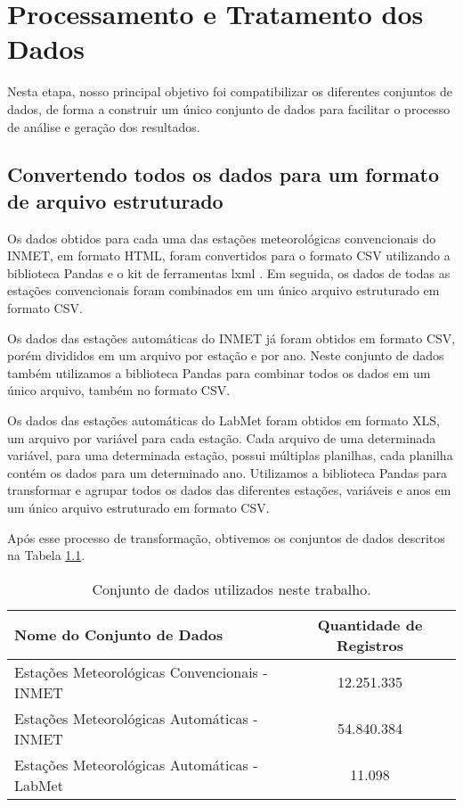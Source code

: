 \chapter{Processamento e Tratamento dos Dados}

Nesta etapa, nosso principal objetivo foi compatibilizar os diferentes conjuntos de dados, de forma a construir um único conjunto de dados para facilitar o processo de análise e geração dos resultados.

\section{Convertendo todos os dados para um formato de arquivo estruturado}

Os dados obtidos para cada uma das estações meteorológicas convencionais do INMET,  em formato HTML, foram convertidos para o formato CSV utilizando a biblioteca Pandas \cite{mckinney2011pandas} e o kit de ferramentas lxml \cite{behnel2005lxml}. Em seguida, os dados de todas as estações convencionais foram combinados em um único arquivo estruturado em formato CSV. 

Os dados das estações automáticas do INMET já foram obtidos em formato CSV, porém divididos em um arquivo por estação e por ano. Neste conjunto de dados também utilizamos a biblioteca Pandas para combinar todos os dados em um único arquivo, também no formato CSV.

Os dados das estações automáticas do LabMet foram obtidos em formato XLS, um arquivo por variável para cada estação. Cada arquivo de uma determinada variável, para uma determinada estação, possui múltiplas planilhas, cada planilha contém os dados para um determinado ano. Utilizamos a biblioteca Pandas para transformar e agrupar todos os dados das diferentes estações, variáveis e anos em um único arquivo estruturado em formato CSV.


Após esse processo de transformação, obtivemos os conjuntos de dados descritos na Tabela \ref{tab:lista_conjunto_de_dados}.

\begin{table}[H]
\caption{Conjunto de dados utilizados neste trabalho.}
\label{tab:lista_conjunto_de_dados}
\begin{tabular}{|l|c|}
\hline
\textbf{Nome do Conjunto de Dados} & \textbf{Quantidade de Registros}\\
\hline
Estações Meteorológicas Convencionais - INMET  & 12.251.335 \\
\hline
Estações Meteorológicas Automáticas - INMET & 54.840.384 \\
\hline
Estações Meteorológicas Automáticas - LabMet & 11.098 \\
\hline
\end{tabular}
\end{table}

